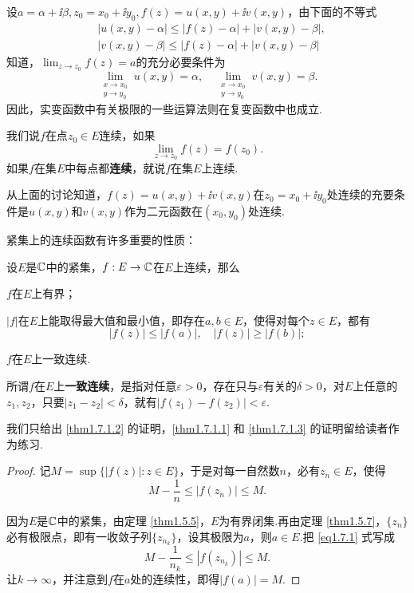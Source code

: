 设$a=\alpha+\ii\beta,z_0=x_0+\ii y_0,f(z)=u(x,y)+\ii v(x,y)$，由下面的不等式
\begin{align*}
  & |u(x,y) - \alpha| \le |f(z) - \alpha| + |v(x,y) - \beta|,\\
  & |v(x,y) - \beta| \le |f(z) - \alpha| + |v(x,y) - \beta|
\end{align*}
知道，$\lim_{z\to z_0}f(z)=a$的充分必要条件为
\[
  \lim_{\substack{x\to x_0\\y\to y_0}} u(x,y) = \alpha,\quad \lim_{\substack{x\to x_0\\y\to y_0}} v(x,y) = \beta.
\]
因此，实变函数中有关极限的一些运算法则在复变函数中也成立.

我们说$f$在点$z_0\in E$连续，如果
\[
  \lim_{z\to z_0} f(z) = f(z_0).
\]
如果$f$在集$E$中每点都\textbf{连续}，就说$f$在集$E$上连续.

从上面的讨论知道，$f(z)=u(x,y)+\ii v(x,y)$在$z_0=x_0+\ii y_0$处连续的充要条件是$u(x,y)$和$v(x,y)$作为二元函数在$(x_0,y_0)$处连续.

紧集上的连续函数有许多重要的性质：
\begin{theorem}\label{thm1.7.1}
  设$E$是$\mathbb C$中的紧集，$f:E\to\mathbb C$在$E$上连续，那么
  \begin{eenum}
    \item \label{thm1.7.1.1} $f$在$E$上有界；
    \item \label{thm1.7.1.2} $|f|$在$E$上能取得最大值和最小值，即存在$a,b\in E$，使得对每个$z\in E$，都有
          \[
            |f(z)| \le |f(a)|,\quad |f(z)|\ge |f(b)|;
          \]
    \item \label{thm1.7.1.3} $f$在$E$上一致连续.
  \end{eenum}
\end{theorem}

所谓$f$在$E$上\textbf{一致连续}，是指对任意$\varepsilon>0$，存在只与$\varepsilon$有关的$\delta>0$，对$E$上任意的$z_1,z_2$，只要$|z_1-z_2|<\delta$，就有$|f(z_1)-f(z_2)|<\varepsilon$.

我们只给出 \ref{thm1.7.1.2} 的证明，\ref{thm1.7.1.1} 和 \ref{thm1.7.1.3} 的证明留给读者作为练习.
\begin{proof}
  记$M=\sup\{|f(z)|:z\in E\}$，于是对每一自然数$n$，必有$z_n\in E$，使得
  \begin{equation}\label{eq1.7.1}
    M - \frac1n \le |f(z_n)| \le M.
  \end{equation}

  因为$E$是$\mathbb C$中的紧集，由定理  \ref{thm1.5.5}，$E$为有界闭集.再由定理 \ref{thm1.5.7}，$\{z_n\}$必有极限点，即有一收敛子列$\{z_{n_k}\}$，设其极限为$a$，则$a\in E$.把 \eqref{eq1.7.1} 式写成
  \[
    M - \frac1{n_k} \le |f(z_{n_k})| \le M.
  \]
  让$k\to\infty$，并注意到$f$在$a$处的连续性，即得$|f(a)|=M$.
\end{proof}

